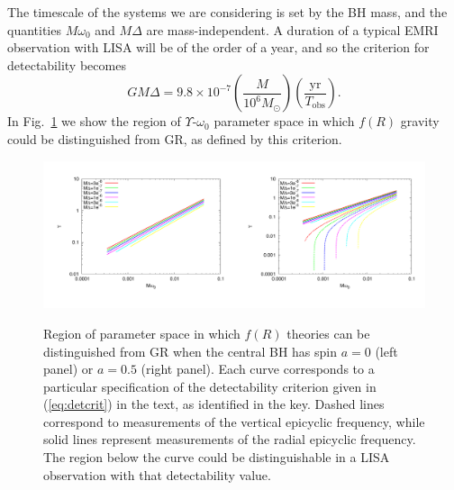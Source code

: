 \documentclass[aps,prd,amsfonts,amssymb,amsmath,nofootinbib,reprint,showpacs]{revtex4-1}
\newcommand{\eqnref}[1]{(\ref{eq:#1})}
\newcommand{\figref}[1]{Fig.\ \ref{fig:#1}}
\newcommand{\sub}[1]{\ensuremath{_\text{#1}}}
\begin{document}
The timescale of the systems we are considering is set by the BH mass, and the quantities $M\omega_0$ and $M\Delta$ are mass-independent. A duration of a typical EMRI observation with LISA will be of the order of a year, and so the criterion for detectability becomes
\begin{equation}
GM\Delta = 9.8\times10^{-7} \left(\frac{M}{10^6 M_{\odot}}\right) \left(\frac{\mathrm{yr}}{T\sub{obs}}\right). \label{eq:detcrit}
\end{equation}
In \figref{epifig} we show the region of $\Upsilon$-$\omega_0$ parameter space in which $f(R)$ gravity could be distinguished from GR, as defined by this criterion.
\begin{figure}[htbp]
\centering
\centerline{\includegraphics[angle=270, width=0.5\textwidth]{EpicycleConstraintsa0}\quad\includegraphics[angle=270, width=0.5\textwidth]{EpicycleConstraintsa05}}
\caption{\label{fig:epifig}Region of parameter space in which $f(R)$ theories can be distinguished from GR when the central BH has spin $a=0$ (left panel) or $a=0.5$ (right panel). Each curve corresponds to a particular specification of the detectability criterion given in \eqnref{detcrit} in the text, as identified in the key. Dashed lines correspond to measurements of the vertical epicyclic frequency, while solid lines represent measurements of the radial epicyclic frequency. The region below the curve could be distinguishable in a LISA observation with that detectability value.}
\end{figure}
\end{document}
